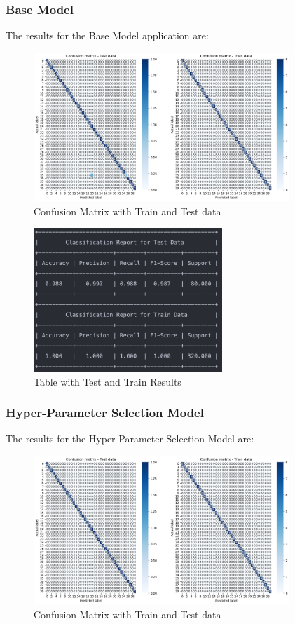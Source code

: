 \documentclass[conference]{IEEEtran}
\begin{document}
\subsubsection{Base Model}
The results for the Base Model application are:

\begin{figure}[!h!]
    \includegraphics[width=3.8in]{LogReg/logreg_1.png}%
    \caption{Confusion Matrix with Train and Test data}%
    \label{fig:conf_LogReg_1}%
\end{figure}

\begin{figure}[!h!]
    \includegraphics[width=2.8in]{LogReg/logreg_r_1.png}%
    \caption{Table with Test and Train Results}%
    \label{fig:conf_LogReg_r_1}%
\end{figure}

\subsubsection{Hyper-Parameter Selection Model}

The results for the Hyper-Parameter Selection Model are:

\begin{figure}[!h!]
    \includegraphics[width=3.8in]{LogReg/logreg_2.png}%
    \caption{Confusion Matrix with Train and Test data}%
    \label{fig:conf_LogReg_2}%
\end{figure}
\end{document}

